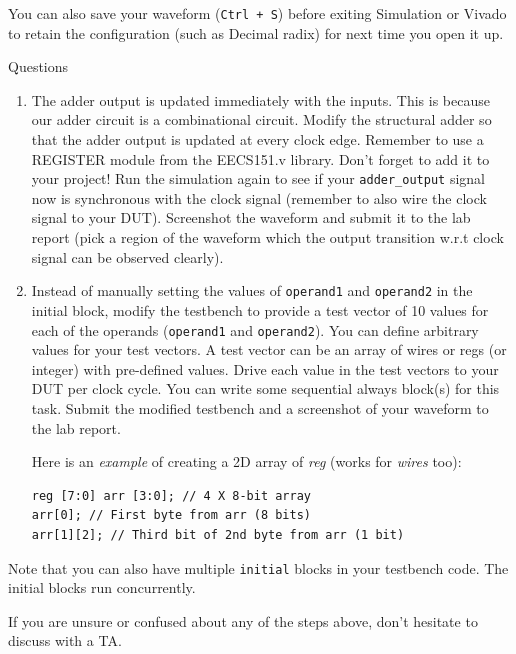 \documentclass[11pt]{article}
\makeatletter
\renewcommand{\subsection}
{\@startsection {subsection}{1}{0pt}
 {-1ex}
 {0.5ex}
 {\bfseries\normalsize}}
\makeatother
\begin{document}
You can also save your waveform (\texttt{Ctrl + S}) before exiting Simulation or Vivado to retain the configuration (such as Decimal radix) for next time you open it up.

\subsection{Questions}\label{sec:Q2}
\begin{enumerate}
  \item The adder output is updated immediately with the inputs. This is because our adder circuit is a combinational circuit. Modify the structural adder so that the adder output is updated at every clock edge. Remember to use a REGISTER module from the EECS151.v library. Don't forget to add it to your project! Run the simulation again to see if your \verb|adder_output| signal now is synchronous with the clock signal (remember to also wire the clock signal to your DUT). Screenshot the waveform and submit it to the lab report (pick a region of the waveform which the output transition w.r.t clock signal can be observed clearly).
  \item Instead of manually setting the values of \verb|operand1| and \verb|operand2| in the initial block, modify the testbench to provide a test vector of 10 values for each of the operands (\verb|operand1| and \verb|operand2|). You can define arbitrary values for your test vectors. A test vector can be an array of wires or regs (or integer) with pre-defined values. Drive each value in the test vectors to your DUT per clock cycle. You can write some sequential always block(s) for this task. Submit the modified testbench and a screenshot of your waveform to the lab report.

Here is an \textit{example} of creating a 2D array of \emph{reg} (works for \emph{wires} too):

\begin{verbatim}
reg [7:0] arr [3:0]; // 4 X 8-bit array
arr[0]; // First byte from arr (8 bits)
arr[1][2]; // Third bit of 2nd byte from arr (1 bit)
\end{verbatim}

\end{enumerate}

Note that you can also have multiple \verb|initial| blocks in your testbench code. The initial blocks run concurrently.

If you are unsure or confused about any of the steps above, don't hesitate to discuss with a TA.
\end{document}
